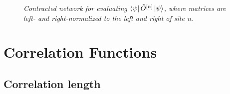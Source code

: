 \begin{figure}[h!]
	\centering
	
	\caption{\textit{Contracted network for evaluating $\bra{\psi} \hat{O}^{[n]} \ket{\psi}$, where matrices are left- and right-normalized to the left and right of site n.}}
	\label{fig:contExpVal}
\end{figure}

\section{Correlation Functions}

\subsection{Correlation length}



